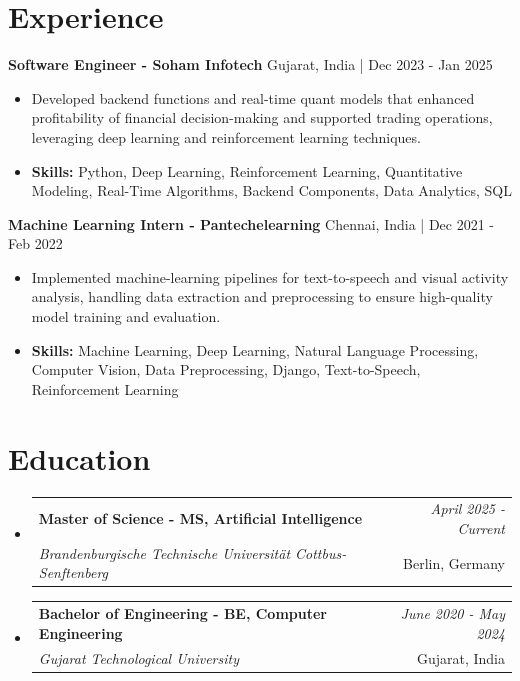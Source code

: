 \documentclass[a4paper,11pt]{article}
\makeatletter
\newcommand{\resumeSubheading}[4]{
\vspace{0.5mm}\item
    \begin{tabular*}{\linewidth}[t]{l@{\extracolsep{\fill}}r}
        \textbf{#1} & \textit{\footnotesize{#4}} \\
        \textit{\footnotesize{#3}} &  \footnotesize{#2}\\
    \end{tabular*}
    \vspace{-2.4mm}
}
\makeatother
\begin{document}
\section{\textbf{Experience}}


\vspace{1mm}
  \textbf{Software Engineer - Soham Infotech} \hfill Gujarat, India | Dec 2023 - Jan 2025
\vspace{-1.5mm} %
\begin{itemize}
  \item Developed backend functions and real-time quant models that enhanced profitability of financial decision-making and supported trading operations, leveraging deep learning and reinforcement learning techniques.

\vspace{-2mm}
  \item \textbf{Skills:} Python, Deep Learning, Reinforcement Learning, Quantitative Modeling, Real-Time Algorithms, Backend Components, Data Analytics, SQL
\end{itemize}

\vspace{1mm}
  \textbf{Machine Learning Intern - Pantechelearning} \hfill Chennai, India | Dec 2021 - Feb 2022
\vspace{-1.5mm} %
\begin{itemize}
  \item Implemented machine-learning pipelines for text-to-speech and visual activity analysis, handling data extraction and preprocessing to ensure high-quality model training and evaluation.
\vspace{-2mm}
  \item \textbf{Skills:} Machine Learning, Deep Learning, Natural Language Processing, Computer Vision, Data Preprocessing, Django, Text-to-Speech, Reinforcement Learning
\end{itemize}\section{\textbf{Education}}
\vspace{-0.4mm}

\begin{itemize}[leftmargin=0.15in, label={}]
\resumeSubheading
{Master of Science - MS, Artificial Intelligence }{Berlin, Germany}
{Brandenburgische Technische Universität Cottbus-Senftenberg  }{April 2025 - Current}

\vspace{1.0mm} %
\resumeSubheading
{Bachelor of Engineering - BE, Computer Engineering  }{Gujarat, India}
{Gujarat Technological University }{June 2020 - May 2024}

\end{itemize}
\end{document}
